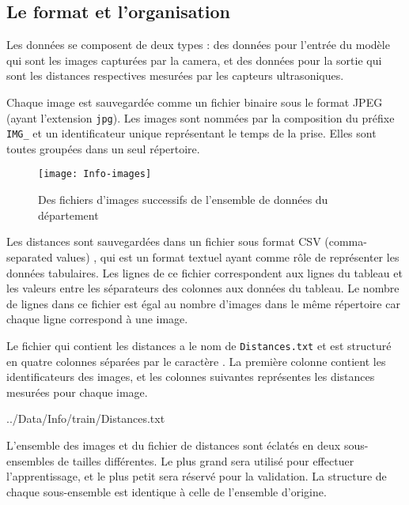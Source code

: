 \subsection{Le format et l'organisation}\label{subsec:format}

Les données se composent de deux types : des données pour l'entrée du modèle
qui sont les images capturées par la camera, et des données pour la sortie
qui sont les distances respectives mesurées par les capteurs ultrasoniques.

Chaque image est sauvegardée comme un fichier binaire sous le format JPEG \cite{wallace1992jpeg}
(ayant l'extension \texttt{jpg}). Les images sont nommées par la composition du
préfixe \texttt{IMG\_} et un identificateur unique représentant le temps de la
prise. Elles sont toutes groupées dans un seul répertoire.

\parbox[][2em][]{\textwidth}{}

\begin{figure}[h]
  \centering
  \texttt{[image: Info-images]}
  \caption{Des fichiers d'images successifs de l'ensemble de données du département}
\end{figure}

\parbox[][1.5em][]{\textwidth}{}

Les distances sont sauvegardées dans un fichier sous format CSV (comma-separated
values) \cite{shafranovich2005common}, qui est un format textuel ayant comme rôle de représenter
les données tabulaires. Les lignes de ce fichier correspondent aux lignes du tableau
et les valeurs entre les séparateurs des colonnes aux données du tableau.
Le nombre de lignes dans ce fichier est égal au nombre d'images dans le
même répertoire car chaque ligne correspond à une image.

Le fichier qui contient les distances a le nom de \texttt{Distances.txt} et est
structuré en quatre colonnes séparées par le caractère \fbox{\texttt{,}}. La première
colonne contient les identificateurs des images, et les colonnes suivantes
représentes les distances mesurées pour chaque image.


{../Data/Info/train/Distances.txt}

L'ensemble des images et du fichier de distances sont éclatés en deux sous-ensembles
de tailles différentes. Le plus grand sera utilisé pour effectuer l'apprentissage,
et le plus petit sera réservé pour la validation. La structure de chaque
sous-ensemble est identique à celle de l'ensemble d'origine.

